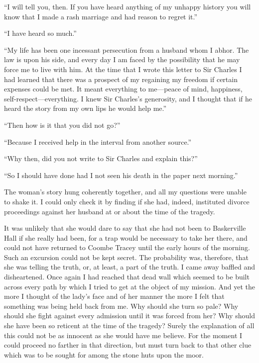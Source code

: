 \documentclass[paper=5.5in:8.5in,BCOR=7mm,twoside,DIV=calc,12pt,usegeometry,openany,chapterprefix,endperiod,headings=big]{scrbook} %
\begin{document}
\enquote{I will tell you, then. If you have heard anything of my unhappy history you will know that I made a rash marriage and had reason to regret it.}

\enquote{I have heard so much.}

\enquote{My life has been one incessant persecution from a husband whom I abhor. The law is upon his side, and every day I am faced by the possibility that he may force me to live with him. At the time that I wrote this letter to Sir Charles I had learned that there was a prospect of my regaining my freedom if certain expenses could be met. It meant everything to me---peace of mind, happiness, self-respect---everything. I knew Sir Charles's generosity, and I thought that if he heard the story from my own lips he would help me.}

\enquote{Then how is it that you did not go?}

\enquote{Because I received help in the interval from another source.}

\enquote{Why then, did you not write to Sir Charles and explain this?}

\enquote{So I should have done had I not seen his death in the paper next morning.}

The woman's story hung coherently together, and all my questions were unable to shake it. I could only check it by finding if she had, indeed, instituted divorce proceedings against her husband at or about the time of the tragedy.


It was unlikely that she would dare to say that she had not been to Baskerville Hall if she really had been, for a trap would be necessary to take her there, and could not have returned to Coombe Tracey until the early hours of the morning. Such an excursion could not be kept secret. The probability was, therefore, that she was telling the truth, or, at least, a part of the truth. I came away baffled and disheartened. Once again I had reached that dead wall which seemed to be built across every path by which I tried to get at the object of my mission. And yet the more I thought of the lady's face and of her manner the more I felt that something was being held back from me. Why should she turn so pale? Why should she fight against every admission until it was forced from her? Why should she have been so reticent at the time of the tragedy? Surely the explanation of all this could not be as innocent as she would have me believe. For the moment I could proceed no farther in that direction, but must turn back to that other clue which was to be sought for among the stone huts upon the moor.
\end{document}
